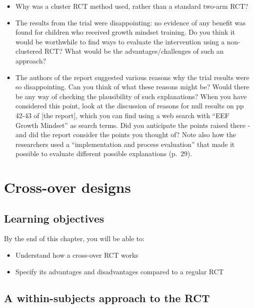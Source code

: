 \documentclass{krantz}
\providecommand{\tightlist}{%
\setlength{\itemsep}{0pt}\setlength{\parskip}{0pt}}
\begin{document}
\begin{itemize}
\item
  Why was a cluster RCT method used, rather than a standard two-arm RCT?
\item
  The results from the trial were disappointing: no evidence of any benefit was found for children who received growth mindset training. Do you think it would be worthwhile to find ways to evaluate the intervention using a non-clustered RCT? What would be the advantages/challenges of such an approach?
\item
  The authors of the report suggested various reasons why the trial results were so disappointing. Can you think of what these reasons might be? Would there be any way of checking the plausibility of such explanations? When you have considered this point, look at the discussion of reasons for null results on pp 42-43 of {[}the report{]}, which you can find using a web search with ``EEF Growth Mindset'' as search terms. Did you anticipate the points raised there - and did the report consider the points you thought of? Note also how the researchers used a ``implementation and process evaluation'' that made it possible to evaluate different possible explanations (p.~29).
\end{itemize}

\hypertarget{crossover}{%
\chapter{Cross-over designs}\label{crossover}}

\hypertarget{learning-objectives-17}{%
\section{Learning objectives}\label{learning-objectives-17}}

By the end of this chapter, you will be able to:

\begin{itemize}
\tightlist
\item
  Understand how a cross-over RCT works
\item
  Specify its advantages and disadvantages compared to a regular RCT
\end{itemize}

\hypertarget{a-within-subjects-approach-to-the-rct}{%
\section{A within-subjects approach to the RCT}\label{a-within-subjects-approach-to-the-rct}}
\end{document}
